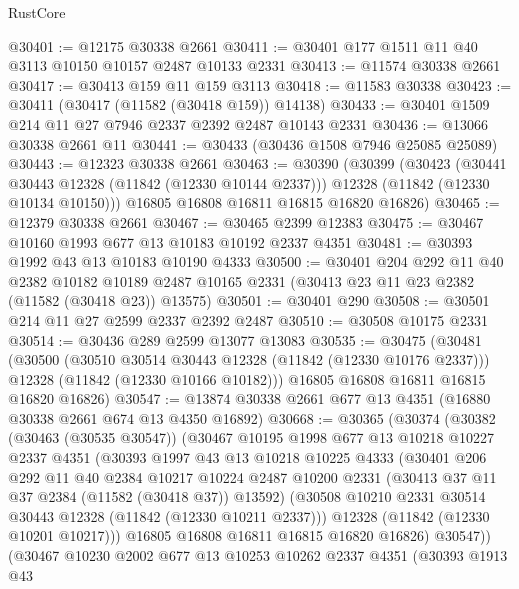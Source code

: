 \begin{lexlean}{RustCore}
\begin{coremodule}
@30401 := @12175 @30338 @2661
@30411 := @30401 @177 @1511 @11 @40 @3113 @10150 @10157 @2487 @10133 @2331
@30413 := @11574 @30338 @2661
@30417 := @30413 @159 @11 @159 @3113
@30418 := @11583 @30338
@30423 := @30411 (@30417 (@11582 (@30418 @159)) @14138)
@30433 := @30401 @1509 @214 @11 @27 @7946 @2337 @2392 @2487 @10143 @2331
@30436 := @13066 @30338 @2661 @11
@30441 := @30433 (@30436 @1508 @7946 @25085 @25089)
@30443 := @12323 @30338 @2661
@30463 := @30390
    (@30399
      (@30423
        (@30441 @30443 @12328 (@11842 (@12330 @10144 @2337)))
        @12328
        (@11842 (@12330 @10134 @10150)))
      @16805
      @16808
      @16811
      @16815
      @16820
      @16826)
@30465 := @12379 @30338 @2661
@30467 := @30465 @2399 @12383
@30475 := @30467 @10160 @1993 @677 @13 @10183 @10192 @2337 @4351
@30481 := @30393 @1992 @43 @13 @10183 @10190 @4333
@30500 := @30401
    @204
    @292
    @11
    @40
    @2382
    @10182
    @10189
    @2487
    @10165
    @2331
    (@30413 @23 @11 @23 @2382 (@11582 (@30418 @23)) @13575)
@30501 := @30401 @290
@30508 := @30501 @214 @11 @27 @2599 @2337 @2392 @2487
@30510 := @30508 @10175 @2331
@30514 := @30436 @289 @2599 @13077 @13083
@30535 := @30475
    (@30481
      (@30500
        (@30510 @30514 @30443 @12328 (@11842 (@12330 @10176 @2337)))
        @12328
        (@11842 (@12330 @10166 @10182)))
      @16805
      @16808
      @16811
      @16815
      @16820
      @16826)
@30547 := @13874 @30338 @2661 @677 @13 @4351 (@16880 @30338 @2661 @674 @13 @4350 @16892)
@30668 := @30365
    (@30374
      (@30382
        (@30463 (@30535 @30547))
        (@30467
          @10195
          @1998
          @677
          @13
          @10218
          @10227
          @2337
          @4351
          (@30393
            @1997
            @43
            @13
            @10218
            @10225
            @4333
            (@30401
              @206
              @292
              @11
              @40
              @2384
              @10217
              @10224
              @2487
              @10200
              @2331
              (@30413 @37 @11 @37 @2384 (@11582 (@30418 @37)) @13592)
              (@30508 @10210 @2331 @30514 @30443 @12328 (@11842 (@12330 @10211 @2337)))
              @12328
              (@11842 (@12330 @10201 @10217)))
            @16805
            @16808
            @16811
            @16815
            @16820
            @16826)
          @30547))
      (@30467
        @10230
        @2002
        @677
        @13
        @10253
        @10262
        @2337
        @4351
        (@30393
          @1913
          @43

\end{coremodule}
\end{lexlean}
